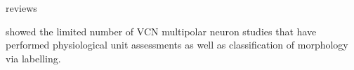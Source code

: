 \documentclass[10pt,a4paper,twoside,openright]{book}
\begin{document}



reviews \citep{BruggeGeisler:1978}

\citet{DoucetRyugo:2006} showed the limited number of VCN multipolar neuron
studies that have performed physiological unit assessments as well as
classification of morphology via labelling.

\end{document}
